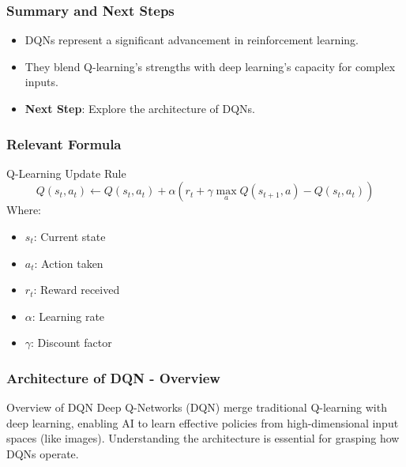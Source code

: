 \documentclass{beamer}
\begin{document}
\begin{frame}[fragile]
    \frametitle{Summary and Next Steps}
    \begin{itemize}
        \item DQNs represent a significant advancement in reinforcement learning.
        \item They blend Q-learning's strengths with deep learning's capacity for complex inputs.
        \item \textbf{Next Step}: Explore the architecture of DQNs.
    \end{itemize}
\end{frame}

\begin{frame}[fragile]
    \frametitle{Relevant Formula}
    \begin{block}{Q-Learning Update Rule}
        \begin{equation}
        Q(s_t, a_t) \leftarrow Q(s_t, a_t) + \alpha \left( r_t + \gamma \max_{a} Q(s_{t+1}, a) - Q(s_t, a_t) \right)
        \end{equation}
        Where:
        \begin{itemize}
            \item $s_t$: Current state
            \item $a_t$: Action taken
            \item $r_t$: Reward received
            \item $\alpha$: Learning rate
            \item $\gamma$: Discount factor
        \end{itemize}
    \end{block}
\end{frame}

\begin{frame}[fragile]
    \frametitle{Architecture of DQN - Overview}
    \begin{block}{Overview of DQN}
        Deep Q-Networks (DQN) merge traditional Q-learning with deep learning, enabling AI to learn effective policies from high-dimensional input spaces (like images). Understanding the architecture is essential for grasping how DQNs operate.
    \end{block}
\end{frame}
\end{document}
